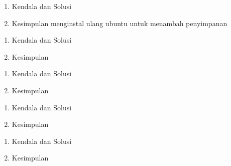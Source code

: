 \begin{enumerate}
\item Kendala dan Solusi


\item Kesimpulan
\newline menginstal ulang ubuntu untuk menambah penyimpanan
\end{enumerate}

\begin{enumerate}
\item Kendala dan Solusi

\item Kesimpulan

\end{enumerate}

\begin{enumerate}
\item Kendala dan Solusi

\item Kesimpulan

\end{enumerate}

\begin{enumerate}
\item Kendala dan Solusi

\item Kesimpulan

\end{enumerate}

\begin{enumerate}
\item Kendala dan Solusi

\item Kesimpulan

\end{enumerate}